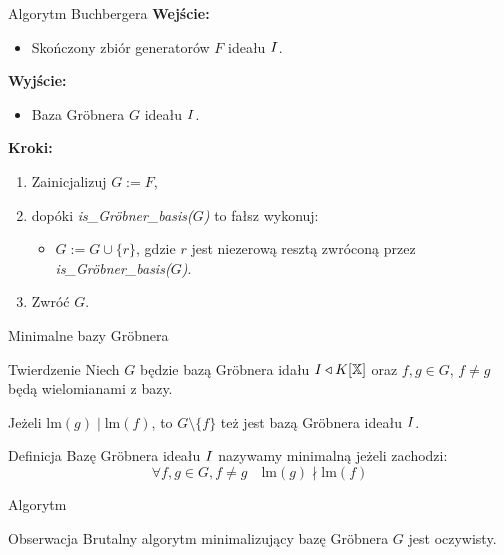 \documentclass{beamer}
\newcommand{\II}{\mathnormal{I}}
\newcommand{\lm}{\textrm{lm}}
\begin{document}
\begin{frame}{Algorytm Buchbergera}
        \textbf{Wejście:} 
    \begin{itemize} 
        \item Skończony zbiór generatorów $F$ ideału $\II$.
    \end{itemize}

    \textbf{Wyjście:} 
    \begin{itemize}
        \item Baza Gr\"obnera $G$ ideału $\II$.
    \end{itemize}

    \textbf{Kroki:}
    \begin{enumerate}
        \item Zainicjalizuj $G := F$, 
        \item dopóki \textit{is\_Gr\"obner\_basis($G$)} to fałsz wykonuj: 
        \begin{itemize}
            \item $G := G \cup \{r \}$, gdzie $r$ jest niezerową resztą zwróconą przez \textit{is\_Gr\"obner\_basis($G$)}.
        \end{itemize}
        \item Zwróć $G$.
    \end{enumerate}
\end{frame}

\begin{frame}{Minimalne bazy Gr\"obnera}
    \begin{block}{Twierdzenie}
        Niech $G$ będzie bazą Gr\"obnera idału $\II \triangleleft K[\mathbb{X}]$ oraz $f,g \in G$, $f \neq g$ będą wielomianami z bazy. 

        Jeżeli $\lm(g) \mid \lm(f)$, to $G \setminus \{f\}$ też jest bazą Gr\"obnera ideału $\II$.
    \end{block}
    \pause 
    \begin{block}{Definicja}
        Bazę Gr\"obnera ideału $\II$ nazywamy minimalną jeżeli zachodzi: 
        $$ \forall f,g \in G, f \neq g \quad \lm(g) \nmid \lm(f)$$
    \end{block}
\end{frame}

\begin{frame}{Algorytm}
    \begin{block}{Obserwacja}
        Brutalny algorytm minimalizujący bazę Gr\"obnera $G$ jest oczywisty.
    \end{block}
\end{frame}
\end{document}
